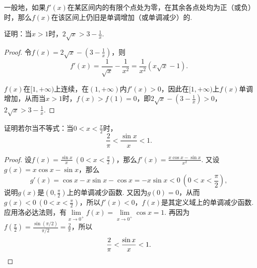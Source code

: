 一般地，如果\(f'(x)\)在某区间内的有限个点处为零，在其余各点处均为正（或负）时，那么\(f(x)\)在该区间上仍旧是单调增加（或单调减少）的.

\begin{example}
证明：当\(x > 1\)时，\(2 \sqrt{x} > 3 - \frac{1}{x}\).
\begin{proof}
令\(f(x) = 2 \sqrt{x} - \left(3 - \frac{1}{x}\right)\)，则\[
f'(x) = \frac{1}{\sqrt{x}} - \frac{1}{x^2}
= \frac{1}{x^2} (x \sqrt{x} - 1).
\]

\(f(x)\)在\([1,+\infty)\)上连续，在\((1,+\infty)\)内\(f'(x) > 0\)，因此在\([1,+\infty)\)上\(f(x)\)单调增加，从而当\(x > 1\)时，\(f(x) > f(1) = 0\)，即\(2 \sqrt{x} - \left(3 - \frac{1}{x}\right) > 0\)，\(2 \sqrt{x} > 3 - \frac{1}{x}\).
\end{proof}
\end{example}

\begin{example}
证明若尔当不等式：当\(0<x<\frac{\pi}{2}\)时，\begin{equation}\label{equation:微分中值定理.若尔当不等式}
\frac{2}{\pi} < \frac{\sin x}{x} < 1.
\end{equation}
\begin{proof}
设\(f(x) = \frac{\sin x}{x}\ (0<x<\frac{\pi}{2})\)，那么\(f'(x) = \frac{x\cos x - \sin x}{x^2}\).
又设\(g(x) = x \cos x - \sin x\)，那么\[
g'(x) = \cos x - x \sin x - \cos x = -x \sin x < 0\ (0<x<\frac{\pi}{2}),
\]说明\(g(x)\)是\((0,\frac{\pi}{2})\)上的单调减少函数.
又因为\(g(0) = 0\)，从而\(g(x) < 0\ (0<x<\frac{\pi}{2})\)，所以\(f'(x) < 0\)，\(f(x)\)是其定义域上的单调减少函数.
应用洛必达法则，有\(\lim\limits_{x\to0^+} f(x) = \lim\limits_{x\to0^+} \cos x = 1\).
再因为\(f(\frac{\pi}{2}) = \frac{\sin(\pi/2)}{\pi/2} = \frac{2}{\pi}\)，所以\[
\frac{2}{\pi} < \frac{\sin x}{x} < 1.
\qedhere
\]
\end{proof}
\end{example}


